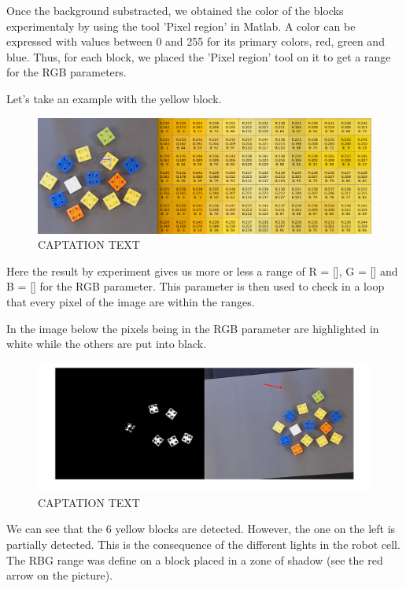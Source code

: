  	Once the background substracted, we obtained the color of the blocks experimentaly by using the tool 'Pixel region' in Matlab. A color can be expressed with values between 0 and 255 for its primary colors, red, green and blue. Thus, for each block, we placed the 'Pixel region' tool on it to get a range for the RGB parameters.\par
\begin{flushleft}
Let's take an example with the yellow block.
\end{flushleft} \par

\begin{figure}[hb]
  \centering
  \includegraphics[scale=0.3]{figures/Thres_Y_manualy2.png}
  \caption[LABEL] {CAPTATION TEXT}
\end{figure}

Here the result by experiment gives us more or less a range of R = [], G = [] and B = [] for the RGB parameter. This parameter is then used to check in a loop that every pixel of the image are within the ranges.\par
In the image below the pixels being in the RGB parameter are highlighted in white while the others are put into black. 

\begin{figure}[hb]
  \centering
  \includegraphics[scale=0.3]{figures/Thres_Y_bad2.png}
  \caption[LABEL] {CAPTATION TEXT}
\end{figure}
  
\begin{flushleft}
We can see that the 6 yellow blocks are detected. However, the one on the left is partially detected. This is the consequence of the different lights in the robot cell. The RBG range was define on a block placed in a zone of shadow (see the red arrow on the picture).
\end{flushleft}  
\par

